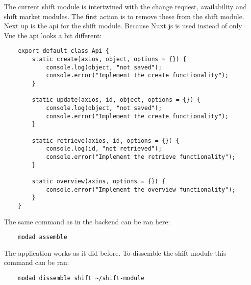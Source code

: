 The current shift module is intertwined with the change request, availability and shift market modules. The first action is to remove these from the shift module. Next up is the api for the shift module. Because Nuxt.js is used instead of only Vue the api looks a bit different:
\begin{verbatim}
    export default class Api {
        static create(axios, object, options = {}) {
            console.log(object, "not saved");
            console.error("Implement the create functionality");
        }

        static update(axios, id, object, options = {}) {
            console.log(object, "not saved");
            console.error("Implement the create functionality");
        }

        static retrieve(axios, id, options = {}) {
            console.log(id, "not retrieved");
            console.error("Implement the retrieve functionality");
        }

        static overview(axios, options = {}) {
            console.error("Implement the overview functionality");
        }
    }
\end{verbatim}

The same command as in the backend can be ran here:
\begin{verbatim}
    modad assemble
\end{verbatim}

The application works as it did before. To dissemble the shift module this command can be ran:
\begin{verbatim}
    modad dissemble shift ~/shift-module
\end{verbatim}
